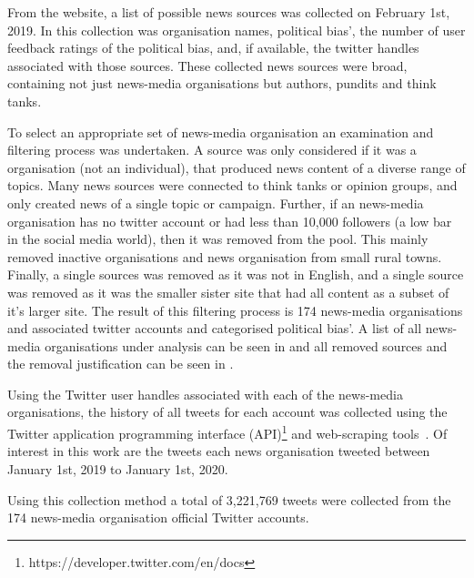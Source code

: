 
From the website, a list of possible news sources was collected on February 1st, 2019. In this collection was organisation names, political bias', the number of user feedback ratings of the political bias, and, if available, the twitter handles associated with those sources. These collected news sources were broad, containing not just news-media organisations but authors, pundits and think tanks. 

To select an appropriate set of news-media organisation an examination and filtering process was undertaken. A source was only considered if it was a organisation (not an individual), that produced news content of a diverse range of topics. Many news sources were connected to think tanks or opinion groups, and only created news of a single topic or campaign. Further, if an news-media organisation has no twitter account or had less than 10,000 followers (a low bar in the social media world), then it was removed from the pool. This mainly removed inactive organisations and news organisation from small rural towns. Finally, a single sources was removed as it was not in English, and a single source was removed as it was the smaller sister site that had all content as a subset of it's larger site.  The result of this filtering process is 174 news-media organisations and associated twitter accounts and categorised political bias'.  A list of all news-media organisations under analysis can be seen in \cite{app:accounts} and all removed sources and the removal justification can be seen in .

Using the Twitter user handles associated with each of the news-media organisations, the history of all tweets for each account was collected using the Twitter application programming interface (API)\footnote{https://developer.twitter.com/en/docs} and web-scraping tools~. Of interest in this work are the tweets each news organisation tweeted between January 1st, 2019 to January 1st, 2020. 

Using this collection method a total of 3,221,769 tweets were collected from the 174 news-media organisation official Twitter accounts. 







